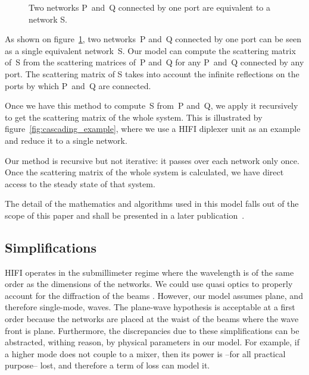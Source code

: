 \documentclass[journal]{IEEEtran}
\begin{document}
\begin{figure}
    \centering
    
    \caption{\label{fig:cascading}Two networks P~and~Q connected by one port are equivalent to a network S.}
\end{figure}

As shown on figure~\ref{fig:cascading}, two networks~P and~Q connected by one port can be seen as a single equivalent network~S.
Our model can compute the scattering matrix of~S from the scattering matrices of~P and~Q for any P~and~Q connected by any port.
The scattering matrix of S takes into account the infinite reflections on the ports by which P~and~Q are connected.

Once we have this method to compute~S from~P and~Q, we apply it recursively to get the scattering matrix of the whole system.
This is illustrated by figure~\ref{fig:cascading_example}, where we use a HIFI diplexer unit as an example and reduce it to a single network.



Our method is recursive but not iterative: it passes over each network only once.
Once the scattering matrix of the whole system is calculated, we have direct access to the steady state of that system.

The detail of the mathematics and algorithms used in this model falls out of the scope of this paper and shall be presented in a later publication~\cite{delforge_2014_phdthesis}.



\subsection{Simplifications}

HIFI operates in the submillimeter regime where the wavelength is of the same order as the dimensions of the networks.
We could use quasi optics to properly account for the diffraction of the beams \cite{goldsmith1998quasioptical}.
However, our model assumes plane, and therefore single-mode, waves.
The plane-wave hypothesis is acceptable at a first order because the networks are placed at the waist of the beams where the wave front is plane.
Furthermore, the discrepancies due to these simplifications can be abstracted, withing reason, by physical parameters in our model.
For example, if a higher mode does not couple to a mixer, then its power is --for all practical purpose-- lost, and therefore a term of loss can model it.
\end{document}
